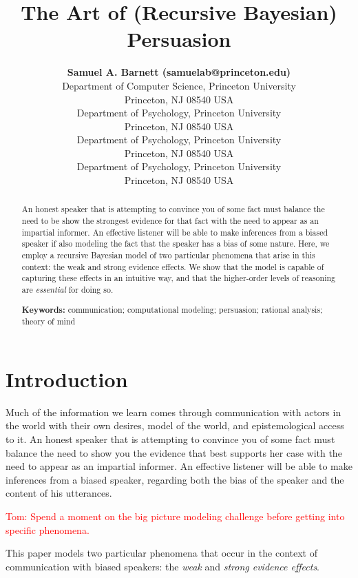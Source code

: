\documentclass[10pt,letterpaper]{article}
\title{The Art of (Recursive Bayesian) Persuasion}
\author{{\large \bf Samuel A. Barnett (samuelab@princeton.edu)} \\
  Department of Computer Science, Princeton University \\
  Princeton, NJ 08540 USA  
\AND {\large \bf Robert X. D. Hawkins (rdhawkins@princeton.edu)} \\
  Department of Psychology, Princeton University \\
  Princeton, NJ 08540 USA
\AND {\large \bf Mark K. Ho (mho@princeton.edu)} \\
  Department of Psychology, Princeton University \\
  Princeton, NJ 08540 USA
\AND {\large \bf Thomas L. Griffiths (tomg@princeton.edu)} \\
  Department of Psychology, Princeton University \\
  Princeton, NJ 08540 USA}
\begin{document}
\maketitle


\begin{abstract}
An honest speaker that is attempting to convince you of some fact must balance
the need to be show the strongest evidence for that fact with the need to appear as an impartial informer. An effective listener
will be able to make inferences from a biased speaker if also modeling the fact that
the speaker has a bias of some nature. Here, we employ a recursive Bayesian model
of two particular phenomena that arise in this context: the weak and strong evidence effects.
We show that the model is capable of capturing these effects in an intuitive way, and that the
higher-order levels of reasoning are \textit{essential} for doing so.

\textbf{Keywords:} 
communication; computational modeling; persuasion; rational analysis; theory of mind
\end{abstract}

\section{Introduction}
\begin{epigraphs}
\end{epigraphs}

Much of the information we learn comes through communication with actors 
in the world with their own desires, model of the world, and epistemological access to it. An honest speaker 
that is attempting to convince you of some fact must balance the need to show you
the evidence that best supports her case
with the need to appear as an impartial informer. An effective listener will be able to 
make inferences from a biased speaker, regarding both the bias of the speaker and the
content of his utterances.

\textcolor{red}{Tom: Spend a moment on the big picture modeling challenge before getting into specific phenomena.}

This paper models two particular phenomena that occur in the context of communication
with biased speakers: the \textit{weak} and \textit{strong evidence effects}. 
\end{document}

